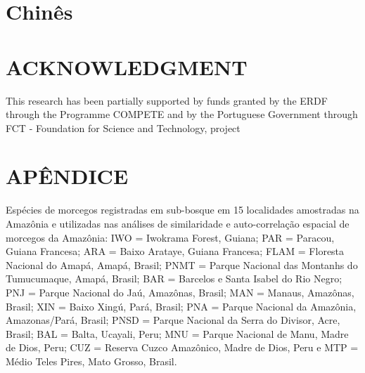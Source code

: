 \section*{Chinês}
\par{}\protect{}


\section*{ACKNOWLEDGMENT}
\par{}This research has been partially supported by funds granted by the ERDF through the
            Programme COMPETE and by the Portuguese Government through FCT - Foundation for Science
            and Technology, project \protect{}
\section*{APÊNDICE}
\par{}Espécies de morcegos registradas em sub-bosque em 15 localidades amostradas na Amazônia e utilizadas nas análises de similaridade e auto-correlação espacial de morcegos da Amazônia: IWO = Iwokrama Forest, Guiana; PAR = Paracou, Guiana Francesa; ARA = Baixo Arataye, Guiana Francesa; FLAM = Floresta Nacional do Amapá, Amapá, Brasil; PNMT = Parque Nacional das Montanhs do Tumucumaque, Amapá, Brasil; BAR = Barcelos e Santa Isabel do Rio Negro; PNJ = Parque Nacional do Jaú, Amazônas, Brasil; MAN = Manaus, Amazônas, Brasil; XIN = Baixo Xingú, Pará, Brasil; PNA = Parque Nacional da Amazônia, Amazonas/Pará, Brasil; PNSD = Parque Nacional da Serra do Divisor, Acre, Brasil; BAL = Balta, Ucayali, Peru; MNU = Parque Nacional de Manu, Madre de Dios, Peru; CUZ = Reserva Cuzco Amazônico, Madre de Dios, Peru e MTP = Médio Teles Pires, Mato Grosso, Brasil.

